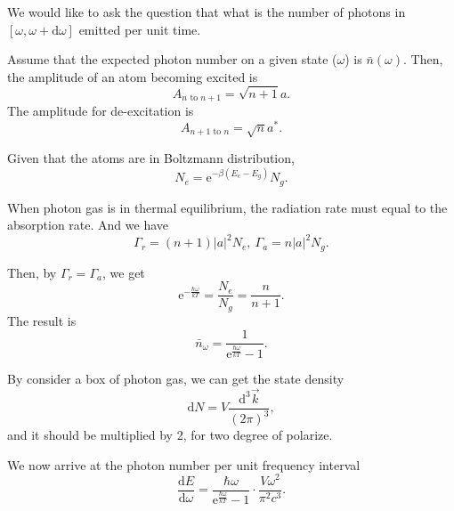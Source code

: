 
We would like to ask the question that what is the number of photons in $[\omega, \omega + \mathrm{d} \omega]$ emitted per unit time.

Assume that the expected photon number on a given state ($\omega$)
is $\bar{n}(\omega)$.
Then, the amplitude of an atom becoming excited is
\begin{equation}
  A_{n \text{ to } n+1} = \sqrt{n+1} a.
\end{equation}
The amplitude for de-excitation is
\begin{equation}
  A_{n+1 \text{ to } n} = \sqrt{n} a^{*}.
\end{equation}

Given that the atoms are in Boltzmann distribution,
\begin{equation}
  N_e = \mathrm{e}^{-\beta (E_e - E_g)} N_g.
\end{equation}

When photon gas is in thermal equilibrium, the radiation rate must equal to the absorption rate. And we have
\begin{equation}
  \Gamma_r = (n+1) |a|^{2} N_e,\ \Gamma_a = n |a|^2 N_g.
\end{equation}

Then, by $\Gamma_r = \Gamma_a$, we get
\begin{equation}
  \mathrm{e}^{- \frac{\hbar \omega}{kT}} = \frac{N_e}{N_g} = \frac{n}{n+1}.
\end{equation}
The result is
\begin{equation}
  \bar{n}_\omega = \frac{1}{\mathrm{e}^{\frac{\hbar \omega}{kT}}-1}.
\end{equation}

By consider a box of photon gas, we can get the state density
\begin{equation}
  \mathrm{d} N = V \frac{\mathrm{d} ^{3} \vec{k}}{\left( 2\pi \right) ^{3}},
\end{equation}
and it should be multiplied by 2, for two degree of polarize.

We now arrive at the photon number per unit frequency interval
\begin{equation}
  \frac{\mathrm{d}E}{\mathrm{d} \omega} = \frac{\hbar\omega}{\mathrm{e}^{\frac{\hbar\omega}{kT}}-1}\cdot \frac{V \omega^{2}}{\pi^{2}c^{3}}.
\end{equation}

